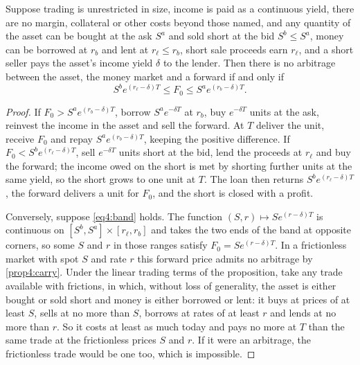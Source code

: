 \begin{chapterrefs}
\begin{proposition}\label{prop4:band}
Suppose trading is unrestricted in size, income is paid as a continuous yield, there are no margin,
collateral or other costs beyond those named, and any quantity of the asset can be bought at the ask $S^a$ and sold short at the bid
$S^b\le S^a$, money can be borrowed at $r_b$ and lent at $r_\ell\le r_b$, short sale proceeds earn
$r_\ell$, and a short seller pays the asset's income yield $\delta$ to the lender. Then there is no
arbitrage between the asset, the money market and a forward if and only if
\begin{equation}\label{eq4:band}
  S^be^{(r_\ell-\delta)T}\le F_0\le S^ae^{(r_b-\delta)T}.
\end{equation}
\end{proposition}

\begin{proof}
If $F_0>S^ae^{(r_b-\delta)T}$, borrow $S^ae^{-\delta T}$ at $r_b$, buy $e^{-\delta T}$ units at the ask,
reinvest the income in the asset and sell the forward. At $T$ deliver the unit, receive $F_0$ and repay
$S^ae^{(r_b-\delta)T}$, keeping the positive difference. If $F_0<S^be^{(r_\ell-\delta)T}$, sell
$e^{-\delta T}$ units short at the bid, lend the proceeds at $r_\ell$ and buy the forward; the income
owed on the short is met by shorting further units at the same yield, so the short grows to one unit
at $T$. The loan then returns $S^be^{(r_\ell-\delta)T}$, the forward delivers a unit for $F_0$, and the
short is closed with a profit.

Conversely, suppose \cref{eq4:band} holds. The function $(S,r)\mapsto Se^{(r-\delta)T}$ is continuous on
$[S^b,S^a]\times[r_\ell,r_b]$ and takes the two ends of the band at opposite corners, so some $S$ and $r$
in those ranges satisfy $F_0=Se^{(r-\delta)T}$. In a frictionless market with spot $S$ and rate $r$ this
forward price admits no arbitrage by \cref{prop4:carry}. Under the linear trading terms of the proposition, take any trade available with frictions, in which, without loss of
generality, the asset is either bought or sold short and money is either borrowed or lent: it
buys at prices of at least $S$, sells at no more than $S$, borrows at rates of at least $r$ and lends
at no more than $r$. So it costs at least as much today and pays no more at $T$ than the same trade at
the frictionless prices $S$ and $r$. If it were an arbitrage, the frictionless trade would be one too,
which is impossible.
\end{proof}


\end{chapterrefs}
